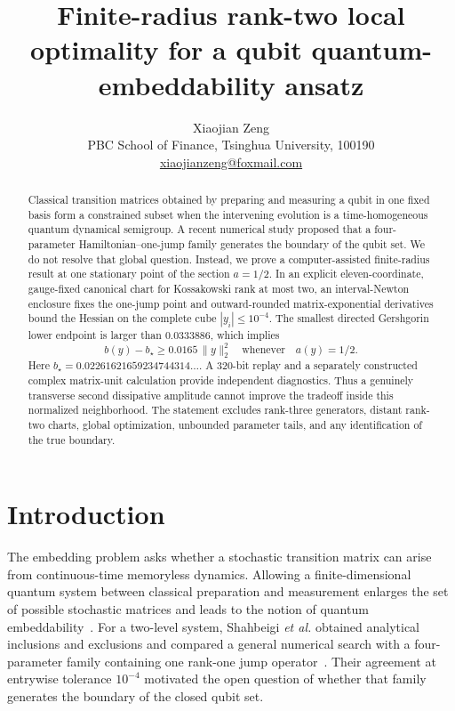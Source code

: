\documentclass[11pt,a4paper]{article}
\title{Finite-radius rank-two local optimality for a qubit quantum-embeddability ansatz}
\author{Xiaojian Zeng\\
\small PBC School of Finance, Tsinghua University, 100190\\
\small \href{mailto:xiaojianzeng@foxmail.com}{xiaojianzeng@foxmail.com}}
\date{}
\begin{document}
\maketitle

\begin{abstract}
Classical transition matrices obtained by preparing and measuring a qubit in
one fixed basis form a constrained subset when the intervening evolution is a
time-homogeneous quantum dynamical semigroup.  A recent numerical study
proposed that a four-parameter Hamiltonian--one-jump family generates the
boundary of the qubit set.  We do not resolve that global question.  Instead,
we prove a computer-assisted finite-radius result at one stationary point of
the section $a=1/2$.  In an explicit eleven-coordinate, gauge-fixed canonical
chart for Kossakowski rank at most two, an interval-Newton enclosure fixes the
one-jump point and outward-rounded matrix-exponential derivatives bound the
Hessian on the complete cube $|y_i|\leq10^{-4}$.  The smallest directed
Gershgorin lower endpoint is larger than $0.0333886$, which implies
\[
 b(y)-b_\star\geq 0.0165\,\lVert y\rVert_2^2
 \quad\text{whenever}\quad a(y)=1/2.
\]
Here $b_\star=0.02261621659234744314\ldots$.  A 320-bit replay and a separately
constructed complex matrix-unit calculation provide independent diagnostics.
Thus a genuinely transverse second dissipative amplitude cannot improve the
tradeoff inside this normalized neighborhood.  The statement excludes
rank-three generators, distant rank-two charts, global optimization,
unbounded parameter tails, and any identification of the true boundary.
\end{abstract}

\section{Introduction}

The embedding problem asks whether a stochastic transition matrix can arise
from continuous-time memoryless dynamics.  Allowing a finite-dimensional
quantum system between classical preparation and measurement enlarges the
set of possible stochastic matrices and leads to the notion of quantum
embeddability~\cite{Korzekwa2021,Shahbeigi2024}.  For a two-level system,
Shahbeigi \emph{et al.} obtained analytical inclusions and exclusions and
compared a general numerical search with a four-parameter family containing
one rank-one jump operator~\cite{Shahbeigi2024}.  Their agreement at entrywise
tolerance $10^{-4}$ motivated the open question of whether that family
generates the boundary of the closed qubit set.
\end{document}
